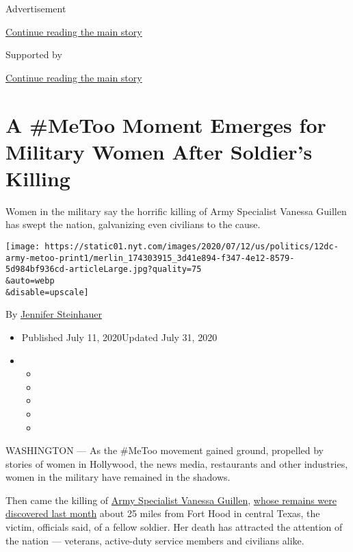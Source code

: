 Advertisement

\protect\hyperlink{after-top}{Continue reading the main story}

Supported by

\protect\hyperlink{after-sponsor}{Continue reading the main story}

\hypertarget{a-metoo-moment-emerges-for-military-women-after-soldiers-killing}{%
\section{A \#MeToo Moment Emerges for Military Women After Soldier's
Killing}\label{a-metoo-moment-emerges-for-military-women-after-soldiers-killing}}

Women in the military say the horrific killing of Army Specialist
Vanessa Guillen has swept the nation, galvanizing even civilians to the
cause.

\texttt{[image: https://static01.nyt.com/images/2020/07/12/us/politics/12dc-army-metoo-print1/merlin\_174303915\_3d41e894-f347-4e12-8579-5d984bf936cd-articleLarge.jpg?quality=75\\\&auto=webp\\\&disable=upscale]}

By \href{https://www.nytimes.com/by/jennifer-steinhauer}{Jennifer
Steinhauer}

\begin{itemize}
\item
  Published July 11, 2020Updated July 31, 2020
\item
  \begin{itemize}
  \item
  \item
  \item
  \item
  \item
  \end{itemize}
\end{itemize}

WASHINGTON --- As the \#MeToo movement gained ground, propelled by
stories of women in Hollywood, the news media, restaurants and other
industries, women in the military have remained in the shadows.

Then came the killing of
\href{https://www.nytimes.com/2020/07/31/podcasts/the-daily/vanessa-guillen-military-metoo.html}{Army
Specialist Vanessa Guillen},
\href{https://www.nytimes.com/article/vanessa-guillen-fort-hood.html}{whose
remains were discovered last month} about 25 miles from Fort Hood in
central Texas, the victim, officials said, of a fellow soldier. Her
death has attracted the attention of the nation --- veterans,
active-duty service members and civilians alike.

